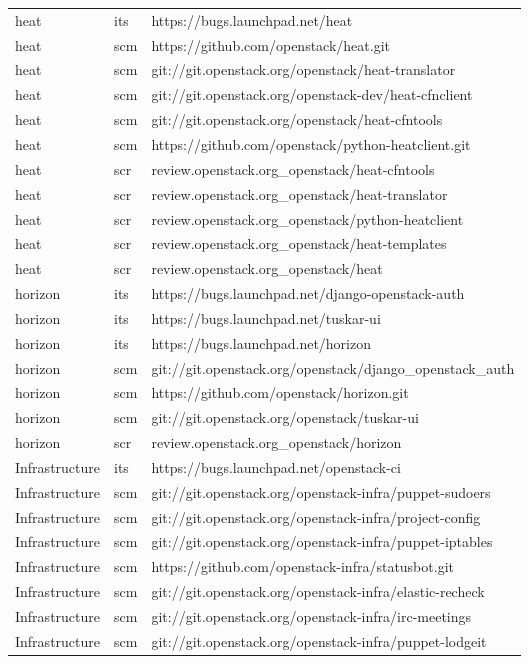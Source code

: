 \begin{center}
\begin{longtable}{|p{4cm}|p{1cm}|p{10cm}|}
heat&its&https://bugs.launchpad.net/heat\\ 
heat&scm&https://github.com/openstack/heat.git\\ 
heat&scm&git://git.openstack.org/openstack/heat-translator\\ 
heat&scm&git://git.openstack.org/openstack-dev/heat-cfnclient\\ 
heat&scm&git://git.openstack.org/openstack/heat-cfntools\\ 
heat&scm&https://github.com/openstack/python-heatclient.git\\ 
heat&scr&review.openstack.org\_openstack/heat-cfntools\\ 
heat&scr&review.openstack.org\_openstack/heat-translator\\ 
heat&scr&review.openstack.org\_openstack/python-heatclient\\ 
heat&scr&review.openstack.org\_openstack/heat-templates\\ 
heat&scr&review.openstack.org\_openstack/heat\\ 
horizon&its&https://bugs.launchpad.net/django-openstack-auth\\ 
horizon&its&https://bugs.launchpad.net/tuskar-ui\\ 
horizon&its&https://bugs.launchpad.net/horizon\\ 
horizon&scm&git://git.openstack.org/openstack/django\_openstack\_auth\\ 
horizon&scm&https://github.com/openstack/horizon.git\\ 
horizon&scm&git://git.openstack.org/openstack/tuskar-ui\\ 
horizon&scr&review.openstack.org\_openstack/horizon\\ 
Infrastructure&its&https://bugs.launchpad.net/openstack-ci\\ 
Infrastructure&scm&git://git.openstack.org/openstack-infra/puppet-sudoers\\ 
Infrastructure&scm&git://git.openstack.org/openstack-infra/project-config\\ 
Infrastructure&scm&git://git.openstack.org/openstack-infra/puppet-iptables\\ 
Infrastructure&scm&https://github.com/openstack-infra/statusbot.git\\ 
Infrastructure&scm&git://git.openstack.org/openstack-infra/elastic-recheck\\ 
Infrastructure&scm&git://git.openstack.org/openstack-infra/irc-meetings\\ 
Infrastructure&scm&git://git.openstack.org/openstack-infra/puppet-lodgeit\\ 

\end{longtable}
\end{center}
